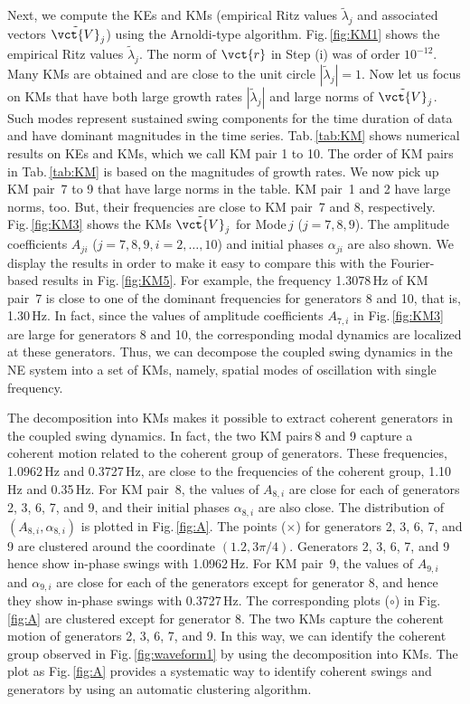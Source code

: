 \documentclass[a4paper,10pt]{article}
\begin{document}
%
Next, we compute the KEs and KMs (empirical Ritz values $\tilde{\lambda}_j$ and associated vectors $\tilde{\vct{V}}_j$) using the Arnoldi-type algorithm.  
Fig.\,\ref{fig:KM1} shows the empirical Ritz values $\tilde{\lambda}_j$.  
The norm of $\vct{r}$ in Step (i) was of order $10^{-12}$.  
Many KMs are obtained and are close to the unit circle $|\tilde{\lambda}_j|=1$.  
Now let us focus on KMs that have both large growth rates $|\tilde{\lambda}_j|$ and large norms of $\tilde{\vct{V}}_j$.  
Such modes represent sustained swing components for the time duration of data and have dominant magnitudes in the time series.  
Tab.\,\ref{tab:KM} shows numerical results on KEs and KMs, which we call KM pair 1 to 10.  
The order of KM pairs in Tab.\,\ref{tab:KM} is based on the magnitudes of growth rates.  
We now pick up KM pair~7 to 9 that have large norms in the table.  
KM pair~1 and 2 have large norms, too.  
But, their frequencies are close to KM pair~7 and 8, respectively.  
Fig.\,\ref{fig:KM3} shows the KMs $\tilde{\vct{V}}_j$ for Mode\,$j$ ($j=7,8,9$).  
The amplitude coefficients $A_{ji}$ ($j=7,8,9, i=2,\ldots,10$) and initial phases $\alpha_{ji}$ are also shown.  
We display the results in order to make it easy to compare this with the Fourier-based results in Fig.\,\ref{fig:KM5}.  
For example, the frequency 1.3078\,Hz of KM pair~7 is close to one of the dominant frequencies for generators 8 and 10, that is, 1.30\,Hz.  
In fact, since the values of amplitude coefficients $A_{7,i}$ in Fig.\,\ref{fig:KM3} are large for generators 8 and 10, the corresponding modal dynamics are localized at these generators.  
Thus, we can decompose the coupled swing dynamics in the NE system into a set of KMs, namely, spatial modes of oscillation with single frequency.  

%
The decomposition into KMs makes it possible to extract coherent generators in the coupled swing dynamics.  
In fact, the two KM pairs\,8 and 9 capture a coherent motion related to the coherent group of generators.  
These frequencies, 1.0962\,Hz and 0.3727\,Hz, are close to the frequencies of the coherent group, 1.10\,Hz and 0.35\,Hz.  
For KM pair~8, the values of $A_{8,i}$ are close for each of generators 2, 3, 6, 7, and 9, and their initial phases $\alpha_{8,i}$ are also close.  
The distribution of $(A_{8,i},\alpha_{8,i})$ is plotted in Fig.\,\ref{fig:A}.  
The points ($\times$) for generators 2, 3, 6, 7, and 9 are clustered around the coordinate $(1.2,3\pi/4)$.  
Generators 2, 3, 6, 7, and 9 hence show in-phase swings with 1.0962\,Hz.  
For KM pair~9, the values of $A_{9,i}$ and $\alpha_{9,i}$ are close for each of the generators except for generator 8, and hence they show in-phase swings with 0.3727\,Hz.  
The corresponding plots ($\circ$) in Fig.\,\ref{fig:A} are clustered except for generator 8.  
The two KMs capture the coherent motion of generators 2, 3, 6, 7, and 9.  
In this way, we can identify the coherent group observed in Fig.\,\ref{fig:waveform1} by using the decomposition into KMs.   
The plot as Fig.\,\ref{fig:A} provides a systematic way to identify coherent swings and generators by using an automatic clustering algorithm.
\end{document}
